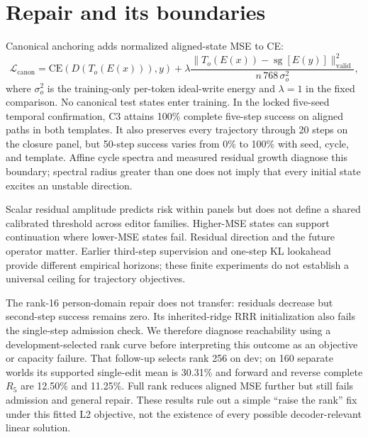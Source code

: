 \documentclass[11pt]{article}
\begin{document}
\section{Repair and its boundaries}
Canonical anchoring adds normalized aligned-state MSE to CE:
\begin{equation}
 \mathcal L_{\mathrm{canon}}=\mathrm{CE}(D(T_o(E(x))),y)
 +\lambda\frac{\|T_o(E(x))-\operatorname{sg}[E(y)]\|^2_{\mathrm{valid}}}
 {n\,768\,\sigma_o^2},
\end{equation}
where $\sigma_o^2$ is the training-only per-token ideal-write energy and
$\lambda=1$ in the fixed comparison. No canonical test states enter training.
In the locked
five-seed temporal confirmation, C3 attains 100\% complete five-step success
on aligned paths in both templates. It also preserves every trajectory through
20 steps on the closure panel, but 50-step success varies from 0\% to 100\%
with seed, cycle, and template. Affine cycle spectra and measured residual
growth diagnose this boundary; spectral radius greater than one does not imply
that every initial state excites an unstable direction.

Scalar residual amplitude predicts risk within panels but does not define a
shared calibrated threshold across editor families. Higher-MSE states can
support continuation where lower-MSE states fail. Residual direction and the
future operator matter. Earlier third-step supervision and one-step KL
lookahead provide different empirical horizons; these finite experiments do
not establish a universal ceiling for trajectory objectives.

The rank-16 person-domain repair does not transfer: residuals decrease but
second-step success remains zero. Its inherited-ridge RRR initialization also
fails the single-step admission check. We therefore diagnose reachability
using a development-selected rank curve before interpreting this outcome as
an objective or capacity failure. That follow-up selects rank 256 on dev;
on 160 separate worlds its supported single-edit mean is 30.31\% and forward
and reverse complete $R_5$ are 12.50\% and 11.25\%. Full rank reduces aligned
MSE further but still fails admission and general repair. These results rule
out a simple ``raise the rank'' fix under this fitted L2 objective, not the
existence of every possible decoder-relevant linear solution.
\end{document}

